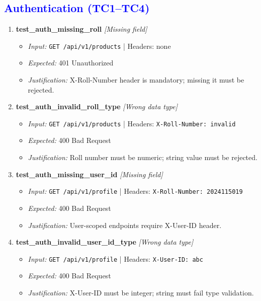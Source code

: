 \documentclass{article}
\begin{document}
\subsection*{\textcolor{blue}{Authentication (TC1--TC4)}}
\begin{enumerate}[label=\textbf{TC\arabic*.}]

\item \textbf{test\_auth\_missing\_roll} \textit{[Missing field]}
\begin{itemize}[noitemsep]
  \item \textit{Input:} \texttt{GET /api/v1/products} | Headers: none
  \item \textit{Expected:} 401 Unauthorized
  \item \textit{Justification:} X-Roll-Number header is mandatory; missing it must be rejected.
\end{itemize}

\item \textbf{test\_auth\_invalid\_roll\_type} \textit{[Wrong data type]}
\begin{itemize}[noitemsep]
  \item \textit{Input:} \texttt{GET /api/v1/products} | Headers: \texttt{X-Roll-Number: invalid}
  \item \textit{Expected:} 400 Bad Request
  \item \textit{Justification:} Roll number must be numeric; string value must be rejected.
\end{itemize}

\item \textbf{test\_auth\_missing\_user\_id} \textit{[Missing field]}
\begin{itemize}[noitemsep]
  \item \textit{Input:} \texttt{GET /api/v1/profile} | Headers: \texttt{X-Roll-Number: 2024115019}
  \item \textit{Expected:} 400 Bad Request
  \item \textit{Justification:} User-scoped endpoints require X-User-ID header.
\end{itemize}

\item \textbf{test\_auth\_invalid\_user\_id\_type} \textit{[Wrong data type]}
\begin{itemize}[noitemsep]
  \item \textit{Input:} \texttt{GET /api/v1/profile} | Headers: \texttt{X-User-ID: abc}
  \item \textit{Expected:} 400 Bad Request
  \item \textit{Justification:} X-User-ID must be integer; string must fail type validation.
\end{itemize}
\end{enumerate}
\end{document}
